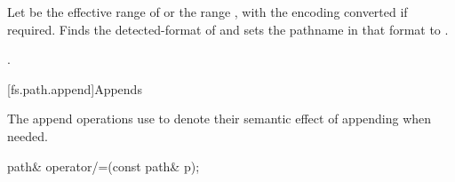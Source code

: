 \begin{itemdescr}
\pnum
\effects
Let  be the effective range of 
or the range , with the encoding converted if required.
Finds the detected-format of 
and sets the pathname in that format to .

\pnum
\returns
{}.
\end{itemdescr}

[fs.path.append]{Appends}

\pnum
The append operations use  to denote their semantic effect of appending
 when needed.

%
\begin{itemdecl}
path& operator/=(const path& p);
\end{itemdecl}

